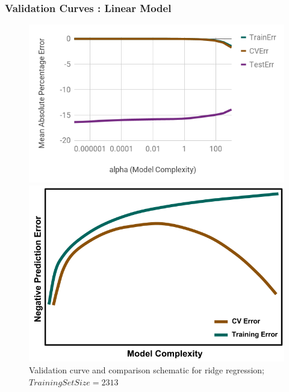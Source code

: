 \begin{frame}
  \frametitle{Validation Curves : Linear Model}
  \begin{figure}
    \begin{minipage}{0.65\textwidth}
      \centering
      \includegraphics[width=\linewidth]{./figures/rr-valid.png}
    \end{minipage}%
    \begin{minipage}{0.4\textwidth}
      \centering
      \includegraphics[width=\linewidth]{./figures/NegValidCurve.png}
    \end{minipage}
    \caption{Validation curve and comparison schematic for ridge regression; $Training Set Size=2313$}
  \end{figure}
\end{frame}

